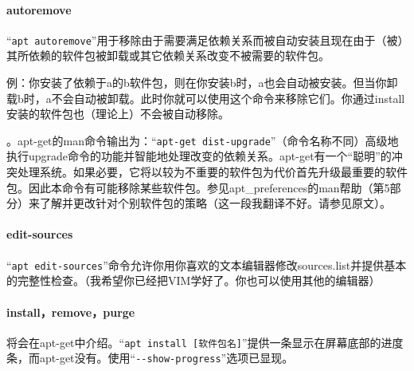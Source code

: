 \paragraph{autoremove}
{\color{red}{警告！这个命令可能对系统造成不可逆的致命破坏！}}  \par
“\verb|apt autoremove|”用于移除由于需要满足依赖关系而被自动安装且现在由于（被）其所依赖的软件包被卸载或其它依赖关系改变不被需要的软件包。 \par
例：你安装了依赖于a的b软件包，则在你安装b时，a也会自动被安装。但当你卸载b时，a不会自动被卸载。此时你就可以使用这个命令来移除它们。你通过install安装的软件包也（理论上）不会被自动移除。 \par
{\color{red}{你需要检查列出的将被卸载的软件的列表，确保其不包括你需要的软件包（尽管它们有可能作为另一个软件包的依赖而被安装）。你可以通过apt-mark将它们标记为“手动（Manual）”}}。apt-get的man命令输出为：“\verb|apt-get dist-upgrade|”（命令名称不同）高级地执行upgrade命令的功能并智能地处理改变的依赖关系。apt-get有一个“聪明”的冲突处理系统。如果必要，它将以较为不重要的软件包为代价首先升级最重要的软件包。因此本命令有可能移除某些软件包。参见apt\_preferences的man帮助（第5部分）来了解并更改针对个别软件包的策略（这一段我翻译不好。请参见原文）。\par
\paragraph{edit-sources}
“\verb|apt edit-sources|”命令允许你用你喜欢的文本编辑器修改sources.list并提供基本的完整性检查。（我希望你已经把VIM学好了。你也可以使用其他的编辑器）  \par
\paragraph{install，remove，purge}
将会在apt-get中介绍。“\verb|apt install [软件包名]|”提供一条显示在屏幕底部的进度条，而apt-get没有。使用“\verb|--show-progress|”选项已显现。\par
